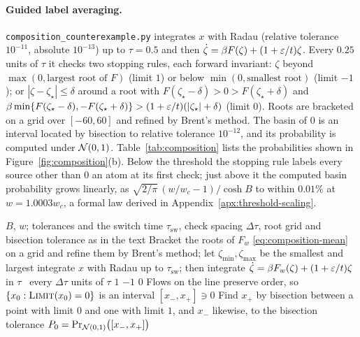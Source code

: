 \documentclass{article} %
\makeatletter
\newif\ificlr
\newcommand{\placeblock}[1]{\ificlr\@nameuse{moved@#1}\fi}
\theoremstyle{plain}
\theoremstyle{definition}
\theoremstyle{remark}
\makeatother
\begin{document}
\paragraph{Guided label averaging.} \texttt{composition\_counterexample.py} integrates $x$ with
Radau (relative tolerance $10^{-11}$, absolute $10^{-13}$) up to $\tau=0.5$ and then
$\dot \zeta=\beta F(\zeta)+(1+\varepsilon/t)\zeta$. Every $0.25$ units of $\tau$ it checks two stopping rules, each
forward invariant: $\zeta$ beyond $\max(0,\text{largest root of }F)$ (limit $1$) or below
$\min(0,\text{smallest root})$ (limit $-1$); or $|\zeta-\zeta_\star|\le\delta$ around a root with
$F(\zeta_\star-\delta)>0>F(\zeta_\star+\delta)$ and $\beta\min\{F(\zeta_\star-\delta),-F(\zeta_\star+\delta)\}>
(1+\varepsilon/t)(|\zeta_\star|+\delta)$ (limit $0$). Roots are bracketed on a grid over $[-60,60]$ and refined
by Brent's method. The basin of $0$ is an interval located by bisection to relative tolerance
$10^{-12}$, and its probability is computed under $\mathcal{N}(0,1)$. Table~\ref{tab:composition} lists
the probabilities shown in Figure~\ref{fig:composition}(b). Below the threshold the stopping rule labels every source other than $0$ an atom at its first
check; just above it the computed basin probability grows linearly, as $\sqrt{2/\pi}\,(w/w_c-1)/\cosh B$ to within $0.01\%$ at $w=1.0003w_c$, a formal
law derived in Appendix~\ref{apx:threshold-scaling}.
\placeblock{compfig}
\begin{algorithm}[htb]
\caption{Midpoint basin of guided label averaging (Theorem~\ref{thm:composition}): stiff
integration with stopping rules from the proof, and bisection}
\label{alg:stiff}
\begin{algorithmic}[1]
\Require $B$, $w$; tolerances and the switch time $\tau_{\mathrm{sw}}$, check spacing
  $\Delta\tau$, root grid and bisection tolerance as in the text
\State Bracket the roots of $F_w$ \eqref{eq:composition-mean} on a grid and refine them by Brent's
  method; let $\zeta_{\min},\zeta_{\max}$ be the smallest and largest
  \State integrate $x$ with Radau up to $\tau_{\mathrm{sw}}$; then integrate
    $\dot\zeta=\beta F_w(\zeta)+(1+\varepsilon/t)\zeta$ in $\tau$
  \Loop\ every $\Delta\tau$ units of $\tau$ 
     \Return $1$
     \Return $-1$
      \State \Return $0$
    \EndIf
  \EndLoop
\EndFunction
\State Flows on the line preserve order, so $\{x_0:\textsc{Limit}(x_0)=0\}$ is an interval
  $[x_-,x_+]\ni0$
\State Find $x_+$ by bisection between a point with limit $0$ and one with limit $1$, and $x_-$
  likewise, to the bisection tolerance
\State \Return $P_0=\Pr_{\mathcal{N}(0,1)}\bigl([x_-,x_+]\bigr)$
\end{algorithmic}
\end{algorithm}
\end{document}
